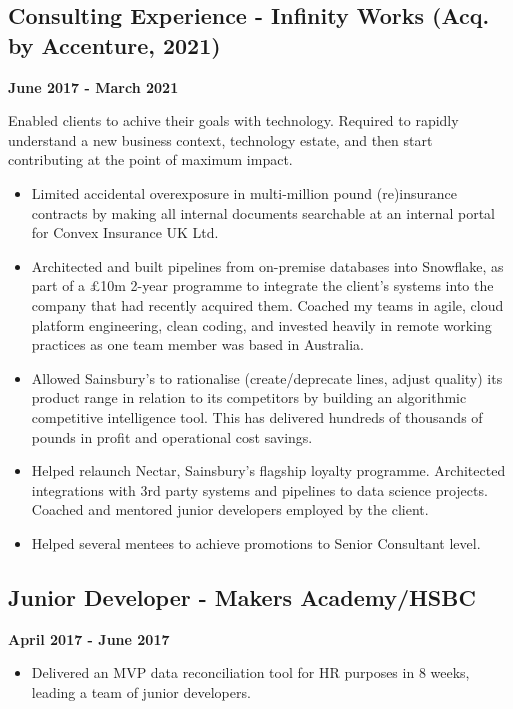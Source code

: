 \documentclass[a4paper]{scrartcl}
\begin{document}
\subsection*{Consulting Experience - Infinity Works (Acq. by Accenture, 2021)}
\textbf{June 2017 - March 2021}

Enabled clients to achive their goals with technology. Required to rapidly understand a new business context, technology estate, and then start contributing at the point of maximum impact.
\begin{itemize}
	\item Limited accidental overexposure in multi-million pound
	      (re)insurance contracts by making
	      all internal documents searchable at an internal portal for Convex
	      Insurance UK Ltd.
	\item Architected and built pipelines from on-premise databases into
	      Snowflake, as part of a £10m 2-year programme to integrate the
	      client's systems into the company that had recently acquired them.
	      Coached my teams in agile, cloud platform engineering, clean
	      coding,
	      and invested heavily in remote working practices as one team member
	      was based
	      in Australia.
	\item Allowed Sainsbury's to rationalise (create/deprecate lines, adjust
	      quality) its product range in relation to its competitors by
	      building an
	      algorithmic competitive intelligence tool. This has delivered
	      hundreds of
	      thousands of pounds in profit and operational cost savings.
	\item Helped relaunch Nectar, Sainsbury's flagship
	      loyalty programme. Architected integrations with 3rd party systems
	      and pipelines to data science projects. Coached and mentored junior
	      developers
	      employed by the client.
	\item Helped several mentees to achieve
	      promotions to Senior Consultant level.
\end{itemize}

\subsection*{Junior Developer - Makers Academy/HSBC}
\textbf{April 2017 - June 2017}
\begin{itemize}
	\item Delivered an MVP data reconciliation tool for HR purposes in 8
	      weeks, leading a team of junior developers.
\end{itemize}
\end{document}
